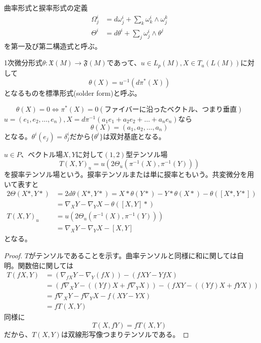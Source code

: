     曲率形式と捩率形式の定義
    \begin{align*}
        \Omega^i_j &= d\omega^i_j + \sum_k \omega^i_k \wedge \omega^k_j\\
        \Theta^i   &= d\theta^i + \sum_j \omega^i_j \wedge \theta^j
    \end{align*}
    を第一及び第二構造式と呼ぶ。

    \begin{dfn}[標準形式]
        1次微分形式$\theta: \mathfrak{X}(M) \rightarrow \mathfrak{F}(M)$であって、$u \in L_p(M), X \in T_u(L(M))$に対して
            \[\theta(X) = u^{-1}(d\pi^*(X))\]
        となるものを標準形式(solder form)と呼ぶ。
    \end{dfn}

        \[\theta(X) = 0 \iff \pi^*(X) = 0(\text{ファイバーに沿ったベクトル、つまり垂直})\]
    $u = (e_1, e_2, \dots, e_n), X = d\pi^{-1}(a_1e_1 + a_2e_2 + \dots + a_ne_n)$なら
        \[\theta(X) = (a_1, a_2, \dots, a_n)\]
    となる。$\theta^i(e_j) = \delta^i_j$だから$\{\theta^i\}$は双対基底となる。


    \begin{dfn}[捩率テンソル]
        $u \in P$、ベクトル場$X, Y$に対して$(1, 2)$型テンソル場
            \[T(X, Y)_u = u(2\Theta_u(\pi^{-1}(X), \pi^{-1}(Y)))\]
        を捩率テンソル場という。捩率テンソルまたは単に捩率ともいう。共変微分を用いて表すと
        \begin{align*}
            2\Theta(X*, Y*)
                &= 2d\theta(X*, Y*) = X*\theta(Y*) - Y*\theta(X*) - \theta([X*, Y*])\\
                &= \nabla_XY - \nabla_YX - \theta([X, Y]*)\\
            T(X, Y)_u
                &= u(2\Theta_u(\pi^{-1}(X), \pi^{-1}(Y)))\\
                &= \nabla_XY - \nabla_YX - [X, Y]
        \end{align*}
        となる。
    \end{dfn}
    \begin{proof}
        $T$がテンソルであることを示す。曲率テンソルと同様に和に関しては自明。関数倍に関しては
        \begin{align*}
            T(fX, Y)
                &= (\nabla_{fX}Y - \nabla_Y(fX)) - (fXY - YfX)\\
                &= (f\nabla_XY - ((Yf)X + f\nabla_YX)) - (fXY - ((Yf)X + fYX))\\
                &= f\nabla_XY - f\nabla_YX - f(XY - YX)\\
                &= fT(X, Y)
        \end{align*}
        同様に
            \[T(X, fY) = fT(X, Y)\]
        だから、$T(X, Y)$は双線形写像つまりテンソルである。
    \end{proof}

